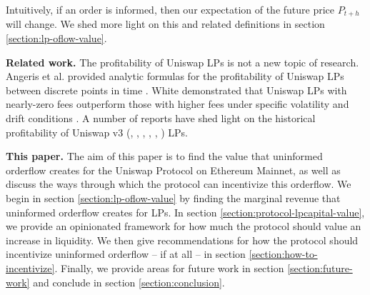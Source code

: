     Intuitively, if an order is informed, then our expectation of the future price $P_{t+h}$ will change. We shed more light on this and related definitions in section \ref{section:lp-oflow-value}.

    \textbf{Related work.}
    The profitability of Uniswap LPs is not a new topic of research. 
    Angeris et al. provided analytic formulas for the profitability of Uniswap LPs between discrete points in time \cite{angeris2019analysis}. %
    White demonstrated that Uniswap LPs with nearly-zero fees outperform those with higher fees under specific volatility and drift conditions \cite{davewhiteuniprofitability}.
    A number of reports have shed light on the historical profitability of Uniswap v3 (\cite{univ3Fees}, \cite{v3dominance}, \cite{thiccythot1}, \cite{thiccythot2}, \cite{crocswap1}, \cite{crocswap2} ) LPs. 

    \textbf{This paper.} The aim of this paper is to find the value that uninformed orderflow creates for the Uniswap Protocol on Ethereum Mainnet, as well as discuss the ways through which the protocol can incentivize this orderflow.
    We begin in section \ref{section:lp-oflow-value} 
    by finding the marginal revenue that uninformed orderflow creates for LPs. In section \ref{section:protocol-lpcapital-value}, we provide an opinionated framework for how much the protocol should value an increase in liquidity.
    We then give recommendations for how the protocol should incentivize uninformed orderflow -- if at all -- in section \ref{section:how-to-incentivize}. Finally, we provide areas for future work in section \ref{section:future-work} and conclude in section \ref{section:conclusion}.
